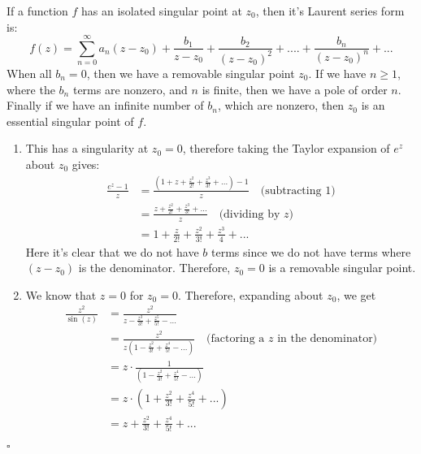 \documentclass[11pt]{article}
\newenvironment{proof}{\noindent{\bf Proof.}}{\hfill $\square$\medskip}
\begin{document}
\begin{proof}
    If a function $f$ has an isolated singular point at $z_{0}$, then it's Laurent series form is:
    $$f(z)=\sum_{n=0}^{\infty}a_{n}(z-z_{0})+\frac{b_{1}}{z-z_{0}}+\frac{b_{2}}{(z-z_{0})^{2}}+....+\frac{b_{n}}{(z-z_{0})^{n}}+...$$
    When all $b_{n}=0$, then we have a removable singular point $z_{0}$. If we have $n\geq1$, where the $b_{n}$ terms are nonzero, and $n$ is finite, then we have a pole of order $n$. Finally if we have an infinite number of $b_{n}$, which are nonzero, then $z_{0}$ is an essential singular point of $f$.
    \begin{enumerate}[label=\textbf{(\alph*)}]
        \item This has a singularity at $z_{0}=0$, therefore taking the Taylor expansion of $e^{z}$ about $z_{0}$ gives:
              \begin{equation}
                  \begin{split}
                      \frac{e^{z}-1}{z}&=\frac{\left(1+z+\frac{z^{2}}{2!}+\frac{z^{3}}{3!}+...\right)-1}{z}\quad\text{(subtracting $1$)}
                      \\
                      &=\frac{z+\frac{z^{2}}{2!}+\frac{z^{3}}{3!}+...}{z}\quad\text{(dividing by $z$)}
                      \\
                      &=1+\frac{z}{2!}+\frac{z^{2}}{3!}+\frac{z^{3}}{4}+...
                  \end{split}
              \end{equation}
              Here it's clear that we do not have $b$ terms since we do not have terms where $(z-z_{0})$ is the denominator. Therefore, $z_{0}=0$ is a removable singular point.
        \item We know that $z=0$ for $z_{0}=0$. Therefore, expanding about $z_{0}$, we get
              \begin{equation}
                  \begin{split}
                      \frac{z^{2}}{\sin(z)}&=\frac{z^{2}}{z-\frac{z^{3}}{3!}+\frac{z^{5}}{5!}-...}\\
                      &=\frac{z^{2}}{z\left(1-\frac{z^{2}}{3!}+\frac{z^{4}}{5!}-...\right)}\quad\text{(factoring a $z$ in the denominator)}\\
                      &=z\cdot \frac{1}{\left(1-\frac{z^{2}}{3!}+\frac{z^{4}}{5!}-...\right)}\\
                      &=z\cdot (1+\frac{z^{2}}{3!}+\frac{z^{4}}{5!}+...)\\
                      &=z+\frac{z^{2}}{3!}+\frac{z^{4}}{5!}+...

\end{split}
\end{equation}
\end{enumerate}
\end{proof}
\end{document}
